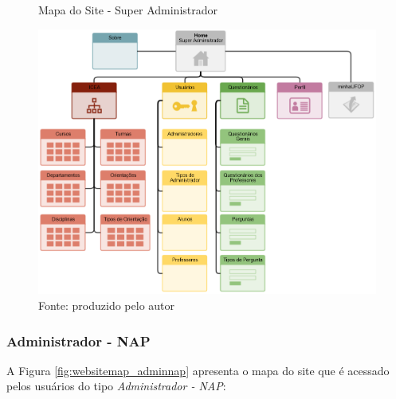 \documentclass[
  12pt,       %
  openright,      %
  oneside,      %
  a4paper,      %
  english,      %
  french,        %
  spanish,     %
  brazil        %
  ]{abntex2-decsi}
\begin{document}
        \begin{figure}[h]	
            \centering
            \caption{Mapa do Site - Super Administrador}						   \label{fig:websitemap_superadmin}
            \includegraphics[width=1\textwidth]{img/websitemap_superadmin}
            \caption*{Fonte: produzido pelo autor}
    	\end{figure}
        
        \newpage
        
        \subsubsection{Administrador - NAP}
		
        A Figura \ref{fig:websitemap_adminnap} apresenta o mapa do site que é acessado pelos usuários do tipo \textit{Administrador - NAP}:
        
\end{document}
